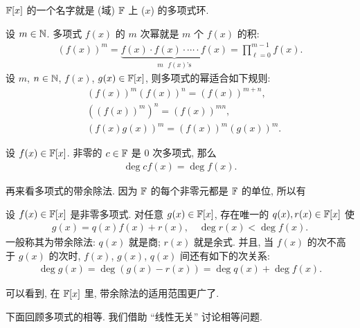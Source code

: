 \begin{remark}
    $\mathbb{F}[x]$ 的一个名字就是 (域) $\mathbb{F}$ 上 ($x$) 的多项式环.
\end{remark}

\begin{definition}
    设 $m \in \mathbb{N}$. 多项式 $f(x)$ 的 $m$ 次幂就是 $m$ 个 $f(x)$ 的积:
    \begin{align*}
        (f(x))^m = \underbrace{f(x) \cdot f(x) \cdot \cdots \cdot f(x)}_{\text{$m$ $f(x)$'s}} = \prod_{\ell = 0}^{m-1} f(x).
    \end{align*}
    设 $m$, $n \in \mathbb{N}$, $f(x)$, $g(x) \in \mathbb{F}[x]$, 则多项式的幂适合如下规则:
    \begin{align*}
         & (f(x))^m (f(x))^n = (f(x))^{m+n},  \\
         & ((f(x))^m)^n = (f(x))^{mn},        \\
         & (f(x) g(x))^m = (f(x))^m (g(x))^m.
    \end{align*}
\end{definition}

\begin{proposition}
    设 $f(x) \in \mathbb{F}[x]$. 非零的 $c \in \mathbb{F}$ 是 $0$ 次多项式, 那么
    \begin{align*}
        \deg cf(x) = \deg f(x).
    \end{align*}
\end{proposition}

再来看多项式的带余除法. 因为 $\mathbb{F}$ 的每个非零元都是 $\mathbb{F}$ 的单位, 所以有

\begin{proposition}
    设 $f(x) \in \mathbb{F}[x]$ 是非零多项式. 对任意 $g(x) \in \mathbb{F}[x]$, 存在唯一的 $q(x), r(x) \in \mathbb{F}[x]$ 使
    \begin{align*}
        g(x) = q(x) f(x) + r(x), \quad \deg r(x) < \deg f(x).
    \end{align*}
    一般称其为带余除法: $q(x)$ 就是商; $r(x)$ 就是余式. 并且, 当 $f(x)$ 的次不高于 $g(x)$ 的次时, $f(x)$, $g(x)$, $q(x)$ 间还有如下的次关系:
    \begin{align*}
        \deg g(x) = \deg (g(x) - r(x)) = \deg q(x) + \deg f(x).
    \end{align*}
\end{proposition}

可以看到, 在 $\mathbb{F}[x]$ 里, 带余除法的适用范围更广了.

下面回顾多项式的相等. 我们借助 ``线性无关'' 讨论相等问题.

